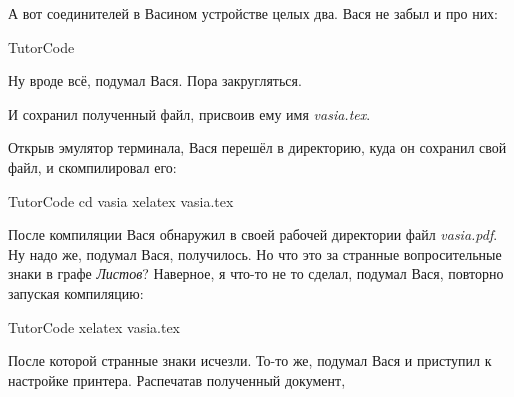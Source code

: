А вот соединителей в Васином устройстве целых два. Вася не забыл и про них:

\begin{SaveVerbatim}{TutorCode}
\end{SaveVerbatim}
\colorbox{codecolor}{}

Ну вроде всё, подумал Вася. Пора закругляться.

\colorbox{codecolor}{}

И сохранил полученный файл, присвоив ему имя \emph{vasia.tex}.

Открыв эмулятор терминала, Вася перешёл в директорию, куда он сохранил свой
файл, и скомпилировал его:

\begin{SaveVerbatim}{TutorCode}
  cd vasia
  xelatex vasia.tex
\end{SaveVerbatim}
\colorbox{terminalcolor}{}

После компиляции Вася обнаружил в своей рабочей директории файл
\emph{vasia.pdf}. Ну надо же, подумал Вася, получилось. Но что это за странные
вопросительные знаки в графе \emph{Листов}? Наверное, я что-то не то сделал,
подумал Вася, повторно запуская компиляцию:

\begin{SaveVerbatim}{TutorCode}
  xelatex vasia.tex
\end{SaveVerbatim}
\colorbox{terminalcolor}{}

После которой странные знаки исчезли. То-то же, подумал Вася и приступил к
настройке принтера. Распечатав полученный документ,

